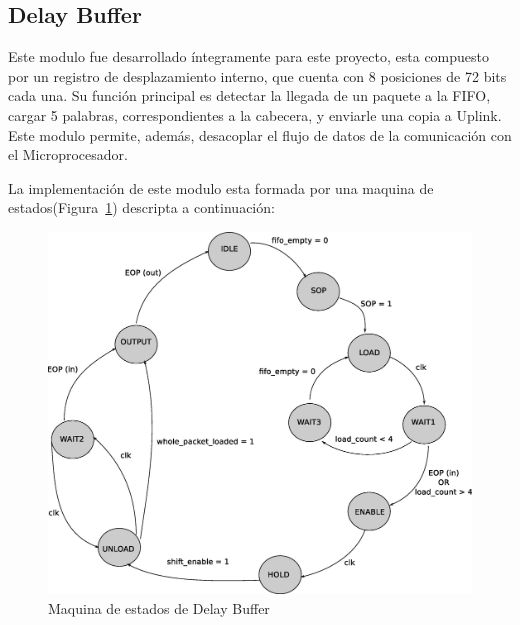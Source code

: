 \subsection{Delay Buffer}
Este modulo fue desarrollado íntegramente para este proyecto, esta compuesto por un registro de desplazamiento interno, que cuenta con 8 posiciones de 72 bits cada una. Su función principal es detectar la llegada de un paquete a la FIFO, cargar 5 palabras, correspondientes a la cabecera, y enviarle una copia a Uplink. Este modulo permite, además, desacoplar el flujo de datos de la comunicación con el Microprocesador.

La implementación de este modulo esta formada por una maquina de estados(Figura~\ref{fig:dbstate}) descripta a continuación:

\begin{figure}[H]
  \centering
	\includegraphics[scale=0.50]{3-arquitectura/graf/estdelaycompleto.eps}
  \caption{Maquina de estados de Delay Buffer}
  \label{fig:dbstate}
\end{figure}

